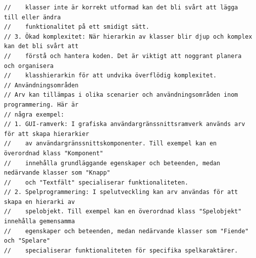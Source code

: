 \begin{verbatim}
//    klasser inte är korrekt utformad kan det bli svårt att lägga till eller ändra
//    funktionalitet på ett smidigt sätt.
// 3. Ökad komplexitet: När hierarkin av klasser blir djup och komplex kan det bli svårt att
//    förstå och hantera koden. Det är viktigt att noggrant planera och organisera
//    klasshierarkin för att undvika överflödig komplexitet.
// Användningsområden
// Arv kan tillämpas i olika scenarier och användningsområden inom programmering. Här är
// några exempel:
// 1. GUI-ramverk: I grafiska användargränssnittsramverk används arv för att skapa hierarkier
//    av användargränssnittskomponenter. Till exempel kan en överordnad klass "Komponent"
//    innehålla grundläggande egenskaper och beteenden, medan nedärvande klasser som "Knapp"
//    och "Textfält" specialiserar funktionaliteten.
// 2. Spelprogrammering: I spelutveckling kan arv användas för att skapa en hierarki av
//    spelobjekt. Till exempel kan en överordnad klass "Spelobjekt" innehålla gemensamma
//    egenskaper och beteenden, medan nedärvande klasser som "Fiende" och "Spelare"
//    specialiserar funktionaliteten för specifika spelkaraktärer.
\end{verbatim}

